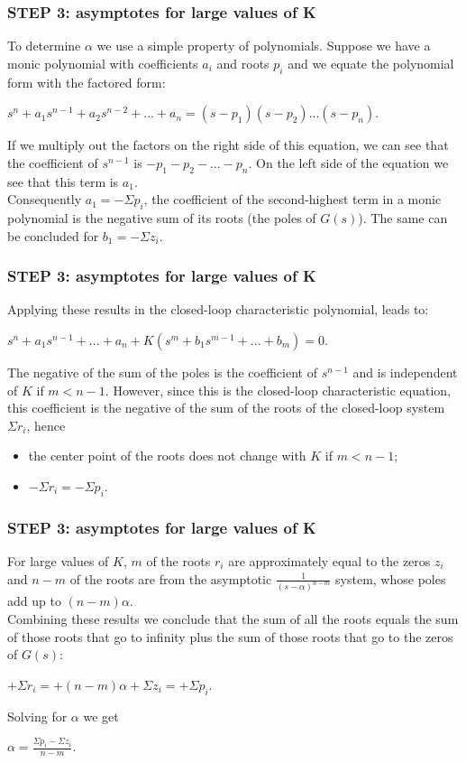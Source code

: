 \begin{frame}
\frametitle{STEP 3: asymptotes for large values of K}
	To determine $\alpha$ we use a simple property of polynomials. Suppose we have a monic polynomial with coefficients $a_i$ and roots $p_i$ and we equate the polynomial form with the factored form:
	\begin{center}
		$s^n + a_1s^{n-1} + a_2s^{n-2} + ... + a_n = (s-p_1)(s-p_2)...(s-p_n).$
	\end{center}
	If we multiply out the factors on the right side of this equation, we can see that the coefficient of $s^{n-1}$ is $-p_1 - p_2 - ... - p_n$. On the left side of the equation we see that this term is $a_1$.\\
	\vspace{1em}
	Consequently $a_1 = -\Sigma p_i$, the coefficient of the second-highest term in a monic polynomial is the negative sum of its roots (the poles of $G(s)$). The same can be concluded for $b_1 = -\Sigma z_i$.
\end{frame}

\begin{frame}
\frametitle{STEP 3: asymptotes for large values of K}
	Applying these results in the closed-loop characteristic polynomial, leads to:
	\begin{center}
		$s^n + a_1 s^{n-1} + ... + a_n + K(s^m + b_1 s^{m-1} + ... + b_m) = 0$.
	\end{center}
	The negative of the sum of the poles is the coefficient of $s^{n-1}$ and is independent of $K$ if $m < n-1$. However, since this is the closed-loop characteristic equation, this coefficient is the negative of the sum of the roots of the closed-loop system $\Sigma r_i$, hence
	\begin{itemize}
		\item the center point of the roots does not change with $K$ if $m < n-1$;
		\item $-\Sigma r_i = -\Sigma p_i$.
	\end{itemize}
\end{frame}

\begin{frame}
\frametitle{STEP 3: asymptotes for large values of K}
	For large values of $K$, $m$ of the roots $r_i$ are approximately equal to the zeros $z_i$ and $n-m$ of the roots are from the asymptotic $\frac{1}{(s-\alpha)^{n-m}}$ system, whose poles add up to $(n-m)\alpha$.\\
	\vspace{1em}
	Combining these results we conclude that the sum of all the roots equals the sum of those roots that go to infinity plus the sum of those roots that go to the zeros of $G(s)$:
	\begin{center}
		$+\Sigma r_i = + (n-m)\alpha + \Sigma z_i = +\Sigma p_i$.
	\end{center}
	Solving for $\alpha$ we get 
	\begin{center}
		$\alpha = \frac{\Sigma p_i - \Sigma z_i}{n-m}$.
	\end{center}
\end{frame}

